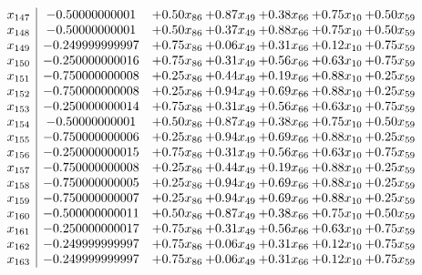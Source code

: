 \documentclass[8pt]{article}
\begin{document}
\[\begin{array}{c| c c@{\hskip 2pt} c@{\hskip 2pt} c@{\hskip 2pt} c@{\hskip 2pt} c@{\hskip 2pt} }
 x_{147}   &  -0.50000000001 & +  0.50 x_{86} & +  0.87 x_{49} & +  0.38 x_{66} & +  0.75 x_{10} & +  0.50 x_{59}\\
 x_{148}   &  -0.50000000001 & +  0.50 x_{86} & +  0.37 x_{49} & +  0.88 x_{66} & +  0.75 x_{10} & +  0.50 x_{59}\\
 x_{149}   &  -0.249999999997 & +  0.75 x_{86} & +  0.06 x_{49} & +  0.31 x_{66} & +  0.12 x_{10} & +  0.75 x_{59}\\
 x_{150}   &  -0.250000000016 & +  0.75 x_{86} & +  0.31 x_{49} & +  0.56 x_{66} & +  0.63 x_{10} & +  0.75 x_{59}\\
 x_{151}   &  -0.750000000008 & +  0.25 x_{86} & +  0.44 x_{49} & +  0.19 x_{66} & +  0.88 x_{10} & +  0.25 x_{59}\\
 x_{152}   &  -0.750000000008 & +  0.25 x_{86} & +  0.94 x_{49} & +  0.69 x_{66} & +  0.88 x_{10} & +  0.25 x_{59}\\
 x_{153}   &  -0.250000000014 & +  0.75 x_{86} & +  0.31 x_{49} & +  0.56 x_{66} & +  0.63 x_{10} & +  0.75 x_{59}\\
 x_{154}   &  -0.50000000001 & +  0.50 x_{86} & +  0.87 x_{49} & +  0.38 x_{66} & +  0.75 x_{10} & +  0.50 x_{59}\\
 x_{155}   &  -0.750000000006 & +  0.25 x_{86} & +  0.94 x_{49} & +  0.69 x_{66} & +  0.88 x_{10} & +  0.25 x_{59}\\
 x_{156}   &  -0.250000000015 & +  0.75 x_{86} & +  0.31 x_{49} & +  0.56 x_{66} & +  0.63 x_{10} & +  0.75 x_{59}\\
 x_{157}   &  -0.750000000008 & +  0.25 x_{86} & +  0.44 x_{49} & +  0.19 x_{66} & +  0.88 x_{10} & +  0.25 x_{59}\\
 x_{158}   &  -0.750000000005 & +  0.25 x_{86} & +  0.94 x_{49} & +  0.69 x_{66} & +  0.88 x_{10} & +  0.25 x_{59}\\
 x_{159}   &  -0.750000000007 & +  0.25 x_{86} & +  0.94 x_{49} & +  0.69 x_{66} & +  0.88 x_{10} & +  0.25 x_{59}\\
 x_{160}   &  -0.500000000011 & +  0.50 x_{86} & +  0.87 x_{49} & +  0.38 x_{66} & +  0.75 x_{10} & +  0.50 x_{59}\\
 x_{161}   &  -0.250000000017 & +  0.75 x_{86} & +  0.31 x_{49} & +  0.56 x_{66} & +  0.63 x_{10} & +  0.75 x_{59}\\
 x_{162}   &  -0.249999999997 & +  0.75 x_{86} & +  0.06 x_{49} & +  0.31 x_{66} & +  0.12 x_{10} & +  0.75 x_{59}\\
 x_{163}   &  -0.249999999997 & +  0.75 x_{86} & +  0.06 x_{49} & +  0.31 x_{66} & +  0.12 x_{10} & +  0.75 x_{59}\\

\end{array}\]
\end{document}
